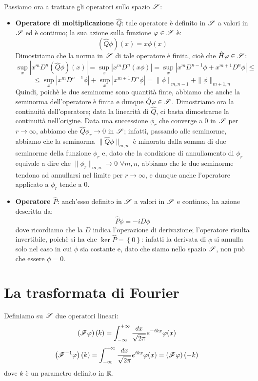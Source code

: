 \\
Passiamo ora a trattare gli operatori sullo spazio $\S$:
\begin{itemize}
\item \textbf{Operatore di moltiplicazione $\hat{Q}$}: tale operatore è definito in $\S$ a valori in $\S$ ed è continuo; la sua azione sulla funzione $\phi \in \S$ è:
$$(\hat{Q} \phi)(x)=x \phi(x)$$
Dimostriamo che la norma in $\S$ di tale operatore è finita, cioè che $\hat{H}\phi \in \S$:
$$\sup_x |x^m D^n (\hat{Q} \phi)(x)|=\sup_x |x^m D^n (x \phi)|= \sup_x |x^m D^{n-1} \phi + x^{m+1} D^n \phi| \leq$$
$$\leq \sup_x |x^m D^{n-1} \phi| + \sup_x |x^{m+1} D^n \phi|= \| \phi \|_{m,n-1} + \| \phi \|_{m+1,n}$$
Quindi, poichè le due seminorme sono quantità finte, abbiamo che anche la seminorma dell'operatore è finita e dunque $\hat{Q} \phi \in \S$. Dimostriamo ora la continuità dell'operatore; data la linearità di $\hat{Q}$, ci basta dimostrarne la continuità nell'origine. Data una successione $\phi_r$ che converge a $0$ in $\S$ per $r \to \infty$, abbiamo che $\hat{Q} \phi_r \to 0$ in $\S$; infatti, passando alle seminorme, abbiamo che la seminorma $\| \hat{Q} \phi \|_{m,n}$ è minorata dalla somma di due seminorme della funzione $\phi_r$ e, dato che la condizione di annullamento di $\phi_r$ equivale a dire che $\| \phi_r \|_{m,n} \to 0$ $\forall m,n$, abbiamo che le due seminorme tendono ad annullarsi nel limite per $r \to \infty$, e dunque anche l'operatore applicato a $\phi_r$ tende a $0$.
\item \textbf{Operatore $\hat{P}$}: anch'esso definito in $\S$ a valori in $\S$ e continuo, ha azione descritta da:
$$\hat{P} \phi = -i D \phi$$
dove ricordiamo che la $D$ indica l'operazione di derivazione; l'operatore risulta invertibile, poichè si ha che $\ker \hat{P} = \left\{ 0 \right\}$: infatti la derivata di $\phi$ si annulla solo nel caso in cui $\phi$ sia costante e, dato che siamo nello spazio $\S$, non può che essere $\phi = 0$.
\end{itemize}
\section{La trasformata di Fourier}
Definiamo su $\S$ due operatori lineari:
$$\left( \F \phi \right) (k) = \int_{-\infty} ^{+\infty} \frac{dx}{\sqrt{2 \pi}} e^{-ikx} \phi (x)$$
$$\left( \F^{-1} \phi \right) (k) = \int_{-\infty} ^{+\infty} \frac{dx}{\sqrt{2 \pi}} e^{ikx} \phi (x)=\left( \F \phi \right) (-k)$$
dove $k$ è un parametro definito in $\R$.

